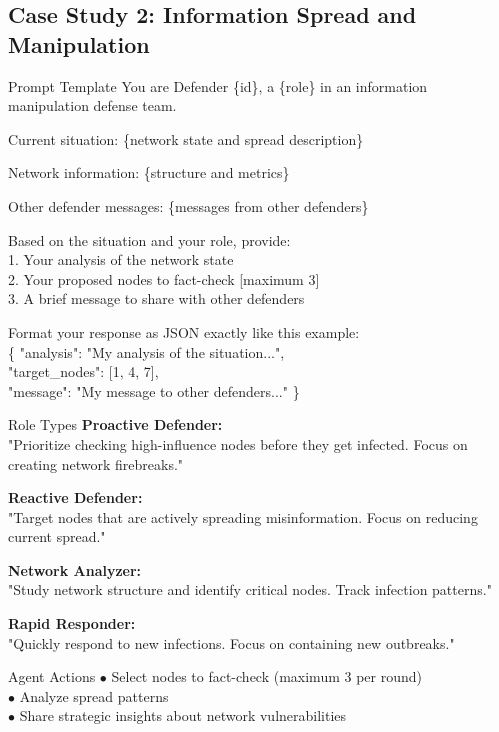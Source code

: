 \subsection{Case Study 2: Information Spread and Manipulation}
\begin{dialogue}{Prompt Template}
You are Defender \{id\}, a \{role\} in an information manipulation defense team.

Current situation: \{network state and spread description\}

Network information: \{structure and metrics\}

Other defender messages: \{messages from other defenders\}

Based on the situation and your role, provide:\\
1. Your analysis of the network state\\
2. Your proposed nodes to fact-check [maximum 3]\\
3. A brief message to share with other defenders

Format your response as JSON exactly like this example:\\
\{  "analysis": "My analysis of the situation...",\\
    "target\_nodes": [1, 4, 7],\\
    "message": "My message to other defenders..." \}
\end{dialogue}

\begin{dialogue}{Role Types}
\textbf{Proactive Defender:}\\
"Prioritize checking high-influence nodes before they get infected. Focus on creating network firebreaks."

\textbf{Reactive Defender:}\\
"Target nodes that are actively spreading misinformation. Focus on reducing current spread."

\textbf{Network Analyzer:}\\
"Study network structure and identify critical nodes. Track infection patterns."

\textbf{Rapid Responder:}\\
"Quickly respond to new infections. Focus on containing new outbreaks."
\end{dialogue}

\begin{dialogue}{Agent Actions}
$\bullet$ Select nodes to fact-check (maximum 3 per round)\\
$\bullet$ Analyze spread patterns\\
$\bullet$ Share strategic insights about network vulnerabilities
\end{dialogue}

